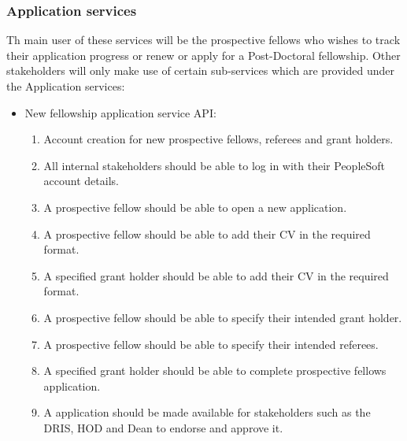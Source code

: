 \documentclass[12pt]{article}
\begin{document}
\subsubsection{Application services}
		Th main user of these services will be the prospective fellows who wishes to track their application progress or renew or apply for a Post-Doctoral fellowship. Other stakeholders will only make use of certain sub-services which are provided under the Application services:
		
		\begin{itemize}
			\item New fellowship application service API:		
			\begin{enumerate}
				\item Account creation for new prospective fellows, referees and grant holders.
				\item All internal stakeholders should be able to log in with their PeopleSoft account details.				
				\item A prospective fellow should be able to open a new application. 
				\item A prospective fellow should be able to add their CV in the required format. 
				\item A specified grant holder should be able to add their CV in the required format.
				\item A prospective fellow should be able to specify their intended grant holder.	
				\item A prospective fellow should be able to specify their intended referees.
				\item A specified grant holder should be able to complete prospective fellows application.
				\item A application should be made available for stakeholders such as the DRIS, HOD and Dean to endorse and approve it.		
			\end{enumerate}
			

\end{itemize}
\end{document}
